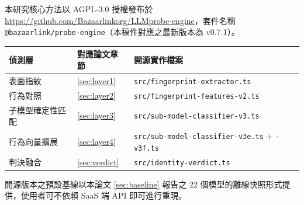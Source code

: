 \documentclass[UTF8,fontset=none,10pt,a4paper,twocolumn]{ctexart}
\begin{document}
本研究核心方法以 AGPL-3.0 授權發布於 \url{https://github.com/Bazaarlinkorg/LLMprobe-engine}，套件名稱 \texttt{@bazaarlink/probe-engine}（本稿件對應之最新版本為 v0.7.1）。

\begin{table}[h]
\centering
\small
\begin{tabular}{@{}lll@{}}
\toprule
偵測層 & 對應論文章節 & 開源實作檔案 \\
\midrule
表面指紋 & \cref{sec:layer1} & \texttt{src/fingerprint-extractor.ts} \\
行為對照 & \cref{sec:layer2} & \texttt{src/fingerprint-features-v2.ts} \\
子模型確定性匹配 & \cref{sec:layer3} & \texttt{src/sub-model-classifier-v3.ts} \\
行為向量擴展 & \cref{sec:layer4} & \texttt{src/sub-model-classifier-v3e.ts} + \texttt{-v3f.ts} \\
判決融合 & \cref{sec:verdict} & \texttt{src/identity-verdict.ts} \\
\bottomrule
\end{tabular}
\end{table}

開源版本之預設基線以本論文 \cref{sec:baseline} 報告之 22 個模型的離線快照形式提供，使用者可不依賴 SaaS 端 API 即可進行重現。
\end{document}

